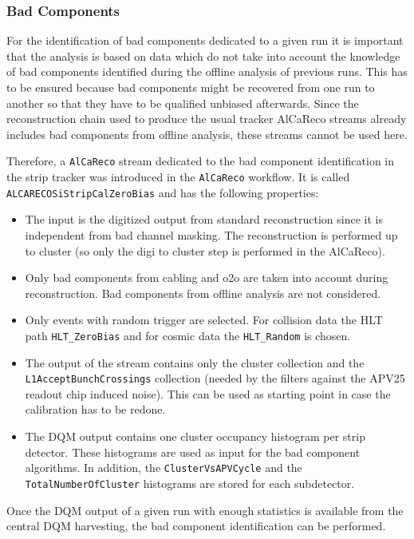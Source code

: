\subsubsection{Bad Components}

For the identification of bad components dedicated to a given run it is important that the analysis is based on data which do not take into account the knowledge of bad components identified during the offline analysis of previous runs. This has to be ensured because bad components might be recovered from one run to another so that they have to be qualified unbiased afterwards. Since the reconstruction chain used to produce the usual tracker AlCaReco streams already includes bad components from offline analysis, these streams cannot be used here.

Therefore, a \texttt{AlCaReco} stream dedicated to the bad component identification in the strip tracker was introduced in the \texttt{AlCaReco} workflow. It is called \texttt{ALCARECOSiStripCalZeroBias} and has the following properties:
\begin{itemize}
\item  The input is the digitized output from standard reconstruction since it is independent from bad channel masking. The reconstruction is performed up to cluster (so only the digi to cluster step is performed in the AlCaReco).
\item Only bad components from cabling and o2o are taken into account during reconstruction. Bad components from offline analysis are not considered.
\item Only events with random trigger are selected. For collision data the HLT path \texttt{HLT\_ZeroBias} and for cosmic data the \texttt{HLT\_Random} is chosen.
\item The output of the stream contains only the cluster collection and the \texttt{L1AcceptBunchCrossings} collection (needed by the filters against the APV25 readout chip induced noise). This can be used as starting point in case the calibration has to be redone.
\item The DQM output contains one cluster occupancy histogram per strip detector. These histograms are used as input for the bad component algorithms. In addition, the \texttt{ClusterVsAPVCycle} and the \texttt{TotalNumberOfCluster} histograms are stored for each subdetector. 
\end{itemize}

Once the DQM output of a given run with enough statistics is available from the central DQM harvesting, the bad component identification can be performed.

